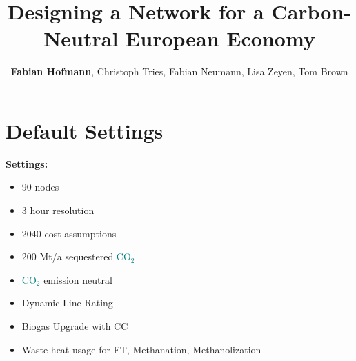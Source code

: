 \documentclass[12pt, aspectratio=169]{beamer}
\title{Designing a \carbon{} Network for a Carbon-Neutral European Economy}
\author{\textbf{Fabian Hofmann}, Christoph Tries, Fabian Neumann, Lisa Zeyen, Tom Brown}
\institute{Technical University Berlin}
\date{}
\newcommand{\carbon}{\textcolor{teal}{CO$_2$}}
\begin{document}
\begin{frame}[plain]
    \titlepage
\end{frame}


\section*{Default Settings}

\begin{frame}
    \textbf{Settings:}
    \begin{itemize}
        \item 90 nodes
        \item 3 hour resolution
        \item 2040 cost assumptions
        \item 200 Mt/a sequestered \carbon{}
        \item \carbon{} emission neutral
        \item Dynamic Line Rating
        \item Biogas Upgrade with CC
        \item Waste-heat usage for FT, Methanation, Methanolization
    \end{itemize}
\end{frame}






\end{document}
